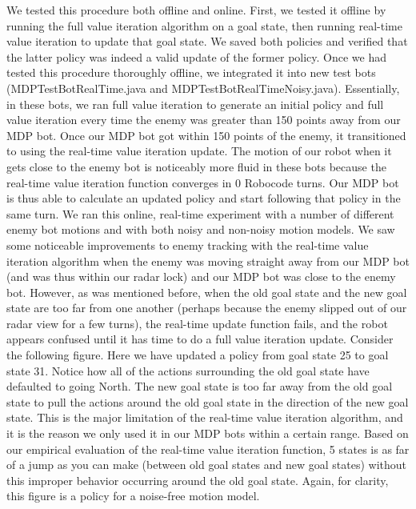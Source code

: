 \documentclass{aiaa-tc}%
\begin{document}
We tested this procedure both offline and online. First, we tested it offline by running the full value iteration algorithm on a goal state, then running real-time value iteration to update that goal state. We saved both policies and verified that the latter policy was indeed a valid update of the former policy. 
Once we had tested this procedure thoroughly offline, we integrated it into new test bots (MDPTestBotRealTime.java and MDPTestBotRealTimeNoisy.java). Essentially, in these bots, we ran full value iteration to generate an initial policy and full value iteration every time the enemy was greater than 150 points away from our MDP bot. Once our MDP bot got within 150 points of the enemy, it transitioned to using the real-time value iteration update. The motion of our robot when it gets close to the enemy bot is noticeably more fluid in these bots because the real-time value iteration function converges in 0 Robocode turns. Our MDP bot is thus able to calculate an updated policy and start following that policy in the same turn. We ran this online, real-time experiment with a number of different enemy bot motions and with both noisy and non-noisy motion models. We saw some noticeable improvements to enemy tracking with the real-time value iteration algorithm when the enemy was moving straight away from our MDP bot (and was thus within our radar lock) and our MDP bot was close to the enemy bot. However, as was mentioned before, when the old goal state and the new goal state are too far from one another (perhaps because the enemy slipped out of our radar view for a few turns), the real-time update function fails, and the robot appears confused until it has time to do a full value iteration update. Consider the following figure. Here we have updated a policy from goal state 25 to goal state 31. Notice how all of the actions surrounding the old goal state have defaulted to going North. The new goal state is too far away from the old goal state to pull the actions around the old goal state in the direction of the new goal state. This is the major limitation of the real-time value iteration algorithm, and it is the reason we only used it in our MDP bots within a certain range. Based on our empirical evaluation of the real-time value iteration function, 5 states is as far of a jump as you can make (between old goal states and new goal states) without this improper behavior occurring around the old goal state. Again, for clarity, this figure is a policy for a noise-free motion model.  
\end{document}
